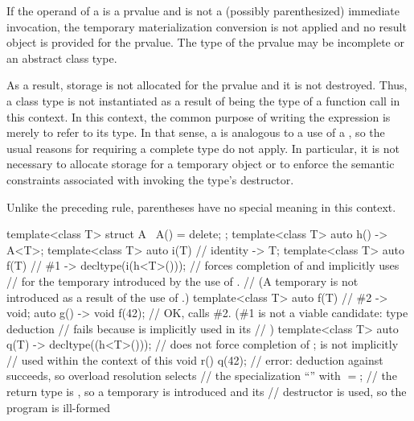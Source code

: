 \pnum
If the operand of a  is a prvalue
and is not a (possibly parenthesized) immediate invocation,
the temporary materialization conversion is not applied
and no result object is provided for the prvalue.
The type of the prvalue may be incomplete or an abstract class type.
\begin{note}
As a result, storage is not allocated for the prvalue and it is not destroyed.
Thus, a class type is not instantiated
as a result of being the type of a function call in this context.
In this context, the common purpose of
writing the expression is merely to refer to its type. In that sense, a
 is analogous to a use of a ,
so the usual reasons for requiring a complete type do not apply. In particular,
it is not necessary to allocate storage for a temporary object or to enforce the
semantic constraints associated with invoking the type's destructor.
\end{note}
\begin{note}
Unlike the preceding rule, parentheses have no special meaning in this context.
\end{note}
\begin{example}
\begin{codeblock}
template<class T> struct A { ~A() = delete; };
template<class T> auto h()
  -> A<T>;
template<class T> auto i(T)     // identity
  -> T;
template<class T> auto f(T)     // \#1
  -> decltype(i(h<T>()));       // forces completion of  and implicitly uses 
                                // for the temporary introduced by the use of .
                                // (A temporary is not introduced as a result of the use of .)
template<class T> auto f(T)     // \#2
  -> void;
auto g() -> void {
  f(42);                        // OK, calls \#2. (\#1 is not a viable candidate: type deduction
                                // fails because  is implicitly used in its
                                // )
}
template<class T> auto q(T)
  -> decltype((h<T>()));        // does not force completion of ;  is not implicitly
                                // used within the context of this 
void r() {
  q(42);                        // error: deduction against  succeeds, so overload resolution selects
                                // the specialization ``'' with $=$;
                                // the return type is , so a temporary is introduced and its
                                // destructor is used, so the program is ill-formed
}
\end{codeblock}
\end{example}

